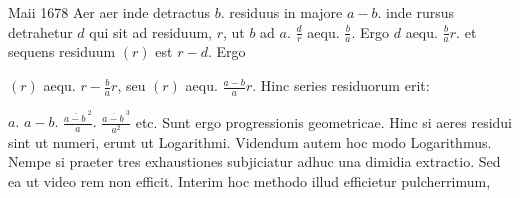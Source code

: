 \noindent%
Maii 1678%
\newline%
Aer\protect{}
aer inde detractus $\displaystyle b$.
residuus in majore $\displaystyle a-b$.
inde rursus detrahetur $\displaystyle d$ qui sit ad residuum, $\displaystyle r$,
ut $\displaystyle b$ ad $\displaystyle a.$
$\displaystyle\frac{d}{r}$ aequ. $\displaystyle\frac{b}{a}$.
Ergo $d$ aequ. $\displaystyle\frac{b}{a}r$. et sequens residuum $\displaystyle(r)$ est $\displaystyle r-d$.
Ergo \rule[-4mm]{0mm}{10mm}$\displaystyle(r)$ aequ. $\displaystyle r-\frac{b}{a}r$, seu $\displaystyle(r)$ aequ. $\displaystyle\frac{a-b}{a}r$.
Hinc series residuorum erit:\quad%
\rule[-4mm]{0mm}{10mm}%
$\displaystyle a.$\quad%
$\displaystyle a-b.$\quad%
$\displaystyle\frac{\overline{a-b\ }^{2}}{a}.$\quad%
$\displaystyle \frac{\overline{a-b\ }^{3}}{a^{2}}$
etc. Sunt ergo progressionis geometricae.\protect{}
Hinc si aeres residui sint ut numeri, erunt
ut Logarithmi.\protect{}
Videndum autem
%
{}
hoc modo Logarithmus.
Nempe si praeter tres exhaustiones subjiciatur adhuc una dimidia extractio.
Sed ea ut video rem non efficit. Interim hoc methodo illud efficietur pulcherrimum,
